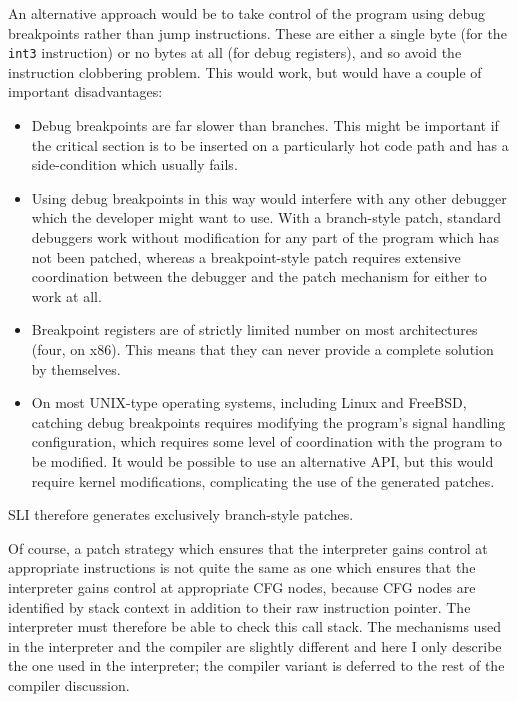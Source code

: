 An alternative approach would be to take control of the program using
debug breakpoints rather than jump instructions.  These are either a
single byte (for the \verb|int3| instruction) or no bytes at all (for
debug registers), and so avoid the instruction clobbering problem.
This would work, but would have a couple of important disadvantages:

\begin{itemize}
\item
  Debug breakpoints are far slower than branches.  This might be
  important if the critical section is to be inserted on a
  particularly hot code path and has a side-condition which usually
  fails.
\item
  Using debug breakpoints in this way would interfere with any other
  debugger which the developer might want to use.  With a branch-style
  patch, standard debuggers work without modification for any part of
  the program which has not been patched, whereas a breakpoint-style
  patch requires extensive coordination between the debugger and the
  patch mechanism for either to work at all.
\item
  Breakpoint registers are of strictly limited number on most
  architectures (four, on x86).  This means that they can never
  provide a complete solution by themselves.
\item
  On most UNIX-type operating systems, including Linux and FreeBSD,
  catching debug breakpoints requires modifying the program's signal
  handling configuration, which requires some level of coordination
  with the program to be modified.  It would be possible to use an
  alternative API, but this would require kernel modifications,
  complicating the use of the generated patches.
\end{itemize}

SLI therefore generates exclusively branch-style patches.



Of course, a patch strategy which ensures that the interpreter gains
control at appropriate instructions is not quite the same as one which
ensures that the interpreter gains control at appropriate CFG nodes,
because {\technique} CFG nodes are identified by stack context in
addition to their raw instruction pointer.  The interpreter must
therefore be able to check this call stack.  The mechanisms used in
the interpreter and the compiler are slightly different and here I
only describe the one used in the interpreter; the compiler variant is
deferred to the rest of the compiler discussion.

